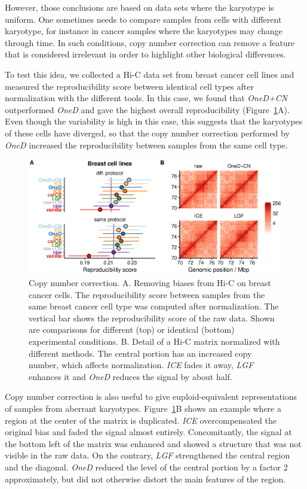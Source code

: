 \documentclass[a4,center,fleqn]{NAR}
\begin{document}
However, those conclusions are based on data sets where the karyotype is
uniform. One sometimes needs to compare samples from cells with different
karyotype, for instance in cancer samples where the karyotypes may change
through time. In such conditions, copy number correction can remove a
feature that is considered irrelevant in order to highlight other
biological differences.

To test this idea, we collected a Hi-C data set from breast cancer cell
lines and measured the reproducibility score between identical cell types
after normalization with the different tools. In this case, we found that
\textit{OneD+CN} outperformed \textit{OneD} and gave the highest overall
reproducibility (Figure~\ref{fig:cnv_correction}A). Even though the
variability is high in this case, this suggests that the karyotypes of
these cells have diverged, so that the copy number correction performed by
\textit{OneD} increased the reproducibility between samples from the same
cell type.

\begin{figure}
\centerline{\includegraphics[width=.49\textwidth]
  {nar_figures/figure_4.eps}}
\caption{Copy number correction. A. Removing biases from Hi-C on breast
cancer cells. The reproducibility score between samples from the same
breast cancer cell type was computed after normalization. The vertical bar
shows the reproducibility score of the raw data. Shown are comparisons for
different (top) or identical (bottom) experimental conditions. B. Detail
of a Hi-C matrix normalized with different methods. The central portion
has an increased copy number, which affects normalization. \textit{ICE}
fades it away, \textit{LGF} enhances it and \textit{OneD} reduces the
signal by about half.}
\label{fig:cnv_correction}
\end{figure}

Copy number correction is also useful to give euploid-equivalent
representations of samples from aberrant karyotypes.
Figure~\ref{fig:cnv_correction}B shows an example where a region at the
center of the matrix is duplicated. \textit{ICE} overcompensated the
original bias and faded the signal almost entirely. Concomitantly, the
signal at the bottom left of the matrix was enhanced and showed a
structure that was not visible in the raw data. On the contrary,
\textit{LGF} strengthened the central region and the diagonal.
\textit{OneD} reduced the level of the central portion by a factor 2
approximately, but did not otherwise distort the main features of the
region.
\end{document}
